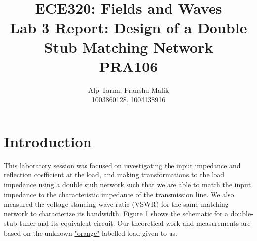 \documentclass[10pt]{article}
\date{}
\begin{document}
\title{\textbf{\Large{\textsc{ECE320:} Fields and Waves}} \\ \Large{Lab 3 Report: Design of a Double Stub Matching Network} \\ \textbf{\small{PRA106}}\vspace{-0.3cm}}
\author{Alp Tarım, Pranshu Malik \\ \footnotesize{1003860128}, \footnotesize{1004138916}\vspace{-3cm}}

\maketitle

\section{Introduction}

This laboratory session was focused on investigating the input impedance and reflection coefficient at the load, and
making transformations to the load impedance using a double stub network such that we are able to match the input impedance 
to the characteristic impedance of the transmission line. We also measured the voltage standing wave ratio (VSWR) for the 
same matching network to characterize its bandwidth. Figure 1 shows the schematic for a double-stub tuner and its equivalent 
circuit. Our theoretical work and measurements are based on the unknown \underline{"orange"} labelled load given to us. 
\end{document}

